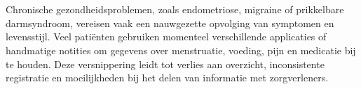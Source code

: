 
%
%
%
%
%

%



\chapter*{}

Chronische gezondheidsproblemen, zoals endometriose, migraine of prikkelbare darmsyndroom, vereisen vaak een nauwgezette opvolging van symptomen en levensstijl. Veel patiënten gebruiken momenteel verschillende applicaties of handmatige notities om gegevens over menstruatie, voeding, pijn en medicatie bij te houden. Deze versnippering leidt tot verlies aan overzicht, inconsistente registratie en moeilijkheden bij het delen van informatie met zorgverleners.

